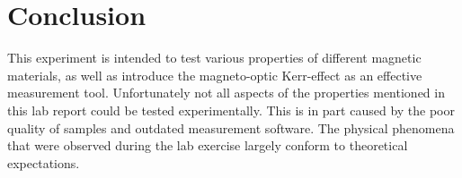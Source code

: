 
\section{Conclusion}
\label{sec:conclusion}

This experiment is intended to test various properties of different magnetic materials,
as well as introduce the magneto-optic Kerr-effect as an effective measurement tool.
Unfortunately not all aspects of the properties mentioned in this lab report could be
tested experimentally. This is in part caused by the poor quality of samples and
outdated measurement software. The physical phenomena that were observed during the
lab exercise largely conform to theoretical expectations.
